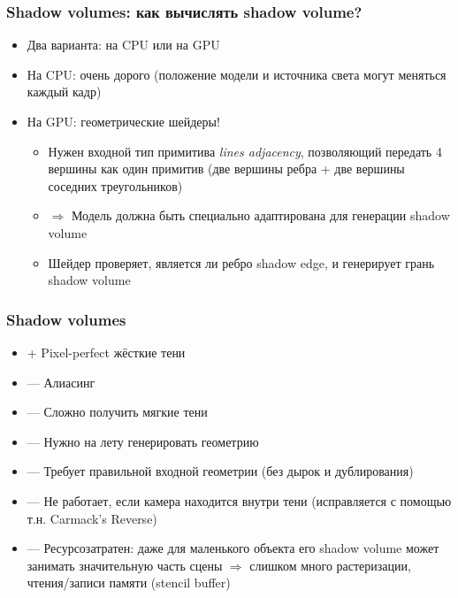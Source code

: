 \documentclass{beamer}
\begin{document}
\begin{frame}[fragile]
\frametitle{Shadow volumes: как вычислять shadow volume?}
\begin{itemize}
\item Два варианта: на CPU или на GPU
\pause
\item На CPU: очень дорого (положение модели и источника света могут меняться каждый кадр)
\pause
\item На GPU: геометрические шейдеры!
\begin{itemize}
\item Нужен входной тип примитива \textit{lines adjacency}, позволяющий передать 4 вершины как один примитив (две вершины ребра + две вершины соседних треугольников)
\pause
\item \begin{math}\Longrightarrow\end{math} Модель должна быть специально адаптирована для генерации shadow volume
\pause
\item Шейдер проверяет, является ли ребро shadow edge, и генерирует грань shadow volume
\end{itemize}
\end{itemize}
\end{frame}

\begin{frame}[fragile]
\frametitle{Shadow volumes}
\begin{itemize}
\item {\color{green}+} Pixel-perfect жёсткие тени
\item {\color{red}---} Алиасинг
\item {\color{red}---} Сложно получить мягкие тени
\item {\color{red}---} Нужно на лету генерировать геометрию
\item {\color{red}---} Требует правильной входной геометрии (без дырок и дублирования)
\item {\color{red}---} Не работает, если камера находится внутри тени (исправляется с помощью т.н. Carmack's Reverse)
\item {\color{red}---} Ресурсозатратен: даже для маленького объекта его shadow volume может занимать значительную часть сцены \begin{math}\Longrightarrow\end{math} слишком много растеризации, чтения/записи памяти (stencil buffer)
\end{itemize}
\end{frame}
\end{document}
